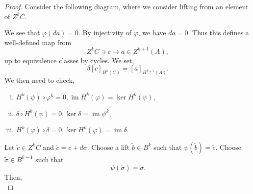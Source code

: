 \documentclass[10pt]{article}
\DeclareMathOperator{\image}{im}
\begin{document}
\begin{proof}
  Consider the following diagram, where we consider lifting from an element of $Z^kC$. 
  \begin{center}
  \end{center}
  We see that $\varphi(da) = 0$. By injectivity of $\varphi$, we have $da=0$. Thus this defines a well-defined map from 
  \begin{equation*}
    Z^kC\ni c\mapsto a\in Z^{k+1}(A),
  \end{equation*}
  up to equivalence classes by cycles. We set,
  \begin{equation*}
    \delta[c]_{H^k(C)} = [a]_{H^{k+1}(A)}.
  \end{equation*}
  We then need to check,
  \begin{enumerate}[i).]
    \item $H^k(\psi)\circ\varphi^k = 0,\image H^k(\varphi)=\ker H^k(\psi)$,
    \item $\delta\circ H^k(\psi) = 0,\ker\delta=\image\psi^k$,
    \item $H^k(\varphi)\circ\delta = 0,\ker H^k(\varphi)=\image \delta$.
  \end{enumerate}
  Let $\tilde{c}\in Z^kC$ and $\tilde{c}=c+d\sigma$. Choose a lift $\tilde{b}\in B^k$ such that $\psi(\tilde{b})=\tilde{c}$. Choose $\tilde{\sigma}\in B^{k-1}$ such that 
  \begin{equation*}
    \psi(\tilde{\sigma}) = \sigma.
  \end{equation*}
  Then,
  \begin{equation*}

\end{equation*}
\end{proof}
\end{document}
